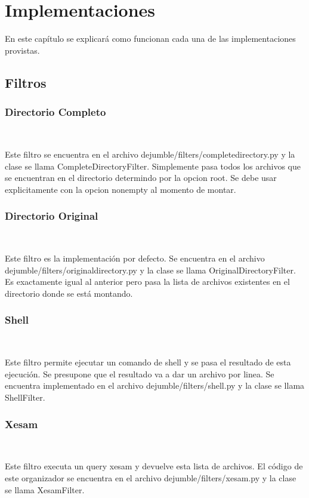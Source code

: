 \chapter{Implementaciones}
\label{implementaciones}

En este capítulo se explicará como funcionan cada una de las implementaciones provistas.


\section{Filtros}
\label{filtros}

\subsection{Directorio Completo}
\label{directorio_completo}

Este filtro se encuentra en el archivo dejumble/filters/completedirectory.py y la clase se llama CompleteDirectoryFilter. Simplemente pasa todos los archivos que se encuentran en el directorio determindo por la opcion root. Se debe usar explicitamente con la opcion nonempty al momento de montar.

\subsection{Directorio Original}
\label{directorio_original}

Este filtro es la implementación por defecto. Se encuentra en el archivo dejumble/filters/originaldirectory.py y la clase se llama OriginalDirectoryFilter. Es exactamente igual al anterior pero pasa la lista de archivos existentes en el directorio donde se está montando.

\subsection{Shell}
\label{shell}

Este filtro permite ejecutar un comando de shell y se pasa el resultado de esta ejecución. Se presupone que el resultado va a dar un archivo por linea. Se encuentra implementado en el archivo dejumble/filters/shell.py y la clase se llama ShellFilter.

\subsection{Xesam}
\label{xesam}

Este filtro executa un query xesam y devuelve esta lista de archivos. El código de este organizador se encuentra en el archivo dejumble/filters/xesam.py y la clase se llama XesamFilter.

